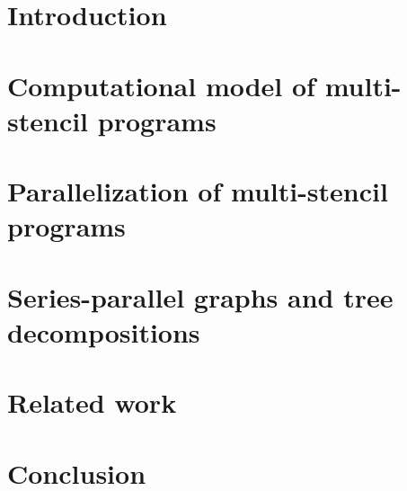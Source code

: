 \documentclass[twoside]{article}
\begin{document}
\makeRR   %

\tableofcontents

\section{Introduction}
\label{sect:introduction}
\section{Computational model of multi-stencil programs}
\label{sect:formalism}

\section{Parallelization of multi-stencil programs}
\label{sect:parallelism}

\section{Series-parallel graphs and tree decompositions}
\label{sect:msp}

% 
% 
%
\section{Related work}
\label{sect:rel}

\section{Conclusion}
\label{sect:concl}

\label{sect:bib}


\end{document}
